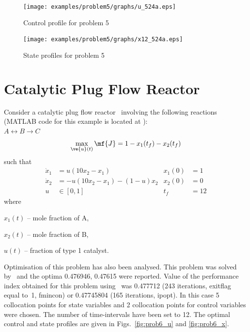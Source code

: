 \begin{figure}[htb]
\begin{minipage}[t]{0.5\linewidth}
\centering
\texttt{[image: examples/problem5/graphs/u\_524a.eps]}
\caption[Problem 5: Control profile]{Control profile for problem 5}
\label{fig:prob5_u}  
\end{minipage}
\begin{minipage}[t]{0.5\linewidth}
\centering
\texttt{[image: examples/problem5/graphs/x12\_524a.eps]}
\caption[Problem 4: State profiles]{State profiles for problem 5}
\label{fig:prob5_x} 
\end{minipage}
\end{figure}

\section{Catalytic Plug Flow Reactor}
\label{sec:prob6}

Consider a catalytic plug flow reactor~\citep{raj01,dad95} involving
the following reactions (MATLAB code for this example is located at
):\\ 
$A \leftrightarrow B\rightarrow C$
\begin{equation}
\max_{\ve{u}(t)} \mf{J} = 1-x_{1}(t_{f})-x_{2}(t_{f})
\label{eq:plugflow} 
\end{equation}
such that
\begin{align*}
\dot{x}_1&=u(10x_2-x_1) &x_1(0) &= 1 \\
\dot{x}_2&=-u(10x_2-x_1)-(1-u)x_2  &x_2(0) &= 0 \\
u &\in [0,1] & t_f &=12
\end{align*}
where
\begin{description}
\item $x_1(t)$ -- mole fraction of A,
\item $x_2(t)$ -- mole fraction of B,
\item $u(t)$ -- fraction of type 1 catalyst.
\end{description}

Optimisation of this problem has also been analysed. This problem was
solved by~\cite{log89,raj01} and the optima 0.476946, 0.47615 were
reported. Value of the performance index obtained for this problem
using~ was 0.477712 (243 iterations, exitflag equal to~1,
fmincon) or 0.47745804 (165 iterations, ipopt). In this case
5 collocation points for state variables and 2 collocation points for
control variables were chosen. The number of time-intervals have been
set to 12. The optimal control and state profiles are given in
Figs.~\ref{fig:prob6_u} and \ref{fig:prob6_x}.

